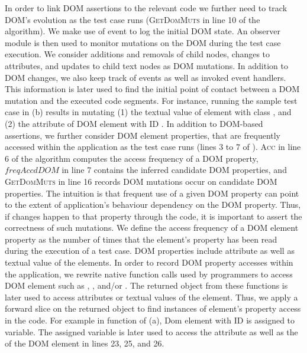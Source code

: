 In order to link DOM assertions to the relevant \javascript code we further need to track DOM's evolution as the test case runs (\textsc{GetDomMuts} in line 10 of the algorithm). We make use of  event to log the initial DOM state. An observer module is then used to monitor mutations on the DOM during the test case execution. 
We consider additions and removals of child nodes, changes to attributes, and updates to child text nodes as DOM mutations.
In addition to DOM changes, we also keep track of \javascript events as well as invoked event handlers. This information is later used to find the initial point of contact between a DOM mutation and the executed code segments.
For instance, running the sample test case in  (b) results in mutating (1) the textual value of  element with class , and (2) the  attribute of DOM element with ID .
In addition to DOM-based assertions, we further consider DOM element properties, that are frequently accessed within the application as the test case runs (lines 3 to 7 of ). 
\textsc{Acc} in line 6 of the algorithm computes the access frequency of a DOM property, $freqAccdDOM$ in line 7 contains the inferred candidate DOM properties, and \textsc{GetDomMuts} in line 16 records DOM mutations occur
on candidate DOM properties.
The intuition is that frequent use of a given DOM property can point to the extent of application's behaviour dependency on the DOM property. Thus, if changes happen to that property through the \javascript code, it is important to assert the correctness of such mutations. We define the access frequency of a DOM element property as the number of times that the element's property has been read during the execution of a test case. DOM properties include attribute as well as textual value of the elements.
In order to record DOM property accesses within the application, we rewrite native function calls used by programmers to access DOM element such as , , and/or . The returned object from these functions is later used to access attributes or textual values of the element. Thus, we apply a forward slice on the returned object to find instances of element's property access in the code.
For example in function  of  (a), Dom element with ID  is assigned to  variable. The assigned variable is later used to access the  attribute as well as the 
of the DOM element in lines 23, 25, and 26.

